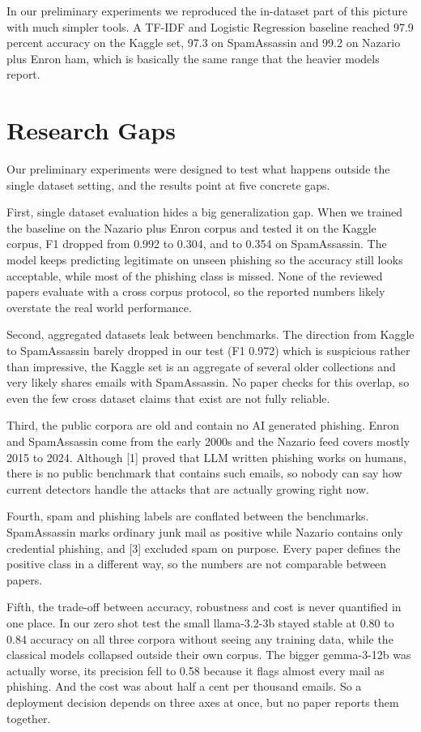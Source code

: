\documentclass[11pt,a4paper]{article}
\begin{document}
In our preliminary experiments we reproduced the in-dataset part of this picture with much simpler tools. A TF-IDF and Logistic Regression baseline reached 97.9 percent accuracy on the Kaggle set, 97.3 on SpamAssassin and 99.2 on Nazario plus Enron ham, which is basically the same range that the heavier models report.

\section{Research Gaps}

Our preliminary experiments were designed to test what happens outside the single dataset setting, and the results point at five concrete gaps.

First, single dataset evaluation hides a big generalization gap. When we trained the baseline on the Nazario plus Enron corpus and tested it on the Kaggle corpus, F1 dropped from 0.992 to 0.304, and to 0.354 on SpamAssassin. The model keeps predicting legitimate on unseen phishing so the accuracy still looks acceptable, while most of the phishing class is missed. None of the reviewed papers evaluate with a cross corpus protocol, so the reported numbers likely overstate the real world performance.

Second, aggregated datasets leak between benchmarks. The direction from Kaggle to SpamAssassin barely dropped in our test (F1 0.972) which is suspicious rather than impressive, the Kaggle set is an aggregate of several older collections and very likely shares emails with SpamAssassin. No paper checks for this overlap, so even the few cross dataset claims that exist are not fully reliable.

Third, the public corpora are old and contain no AI generated phishing. Enron and SpamAssassin come from the early 2000s and the Nazario feed covers mostly 2015 to 2024. Although [1] proved that LLM written phishing works on humans, there is no public benchmark that contains such emails, so nobody can say how current detectors handle the attacks that are actually growing right now.

Fourth, spam and phishing labels are conflated between the benchmarks. SpamAssassin marks ordinary junk mail as positive while Nazario contains only credential phishing, and [3] excluded spam on purpose. Every paper defines the positive class in a different way, so the numbers are not comparable between papers.

Fifth, the trade-off between accuracy, robustness and cost is never quantified in one place. In our zero shot test the small llama-3.2-3b stayed stable at 0.80 to 0.84 accuracy on all three corpora without seeing any training data, while the classical models collapsed outside their own corpus. The bigger gemma-3-12b was actually worse, its precision fell to 0.58 because it flags almost every mail as phishing. And the cost was about half a cent per thousand emails. So a deployment decision depends on three axes at once, but no paper reports them together.
\end{document}
